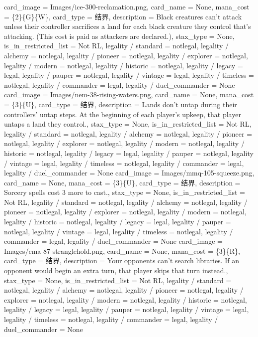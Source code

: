 \documentclass[lang = cn, color = black, 10pt]{AllThatStax}
\begin{document}
\card
{
	card_image = Images/ice-300-reclamation.png,
	card_name = None,
	mana_cost = \{2\}\{G\}\{W\},
	card_type = 结界,
	description = Black creatures can't attack unless their controller sacrifices a land for each black creature they control that's attacking. (This cost is paid as attackers are declared.),
	stax_type = None,
	is_in_restricted_list = Not RL,
	legality / standard = notlegal,
	legality / alchemy = notlegal,
	legality / pioneer = notlegal,
	legality / explorer = notlegal,
	legality / modern = notlegal,
	legality / historic = notlegal,
	legality / legacy = legal,
	legality / pauper = notlegal,
	legality / vintage = legal,
	legality / timeless = notlegal,
	legality / commander = legal,
	legality / duel_commander = None
}
\card
{
	card_image = Images/nem-38-rising-waters.png,
	card_name = None,
	mana_cost = \{3\}\{U\},
	card_type = 结界,
	description = Lands don't untap during their controllers' untap steps.
	At the beginning of each player's upkeep, that player untaps a land they control.,
	stax_type = None,
	is_in_restricted_list = Not RL,
	legality / standard = notlegal,
	legality / alchemy = notlegal,
	legality / pioneer = notlegal,
	legality / explorer = notlegal,
	legality / modern = notlegal,
	legality / historic = notlegal,
	legality / legacy = legal,
	legality / pauper = notlegal,
	legality / vintage = legal,
	legality / timeless = notlegal,
	legality / commander = legal,
	legality / duel_commander = None
}
\card
{
	card_image = Images/mmq-105-squeeze.png,
	card_name = None,
	mana_cost = \{3\}\{U\},
	card_type = 结界,
	description = Sorcery spells cost {3} more to cast.,
	stax_type = None,
	is_in_restricted_list = Not RL,
	legality / standard = notlegal,
	legality / alchemy = notlegal,
	legality / pioneer = notlegal,
	legality / explorer = notlegal,
	legality / modern = notlegal,
	legality / historic = notlegal,
	legality / legacy = legal,
	legality / pauper = notlegal,
	legality / vintage = legal,
	legality / timeless = notlegal,
	legality / commander = legal,
	legality / duel_commander = None
}
\card
{
	card_image = Images/cma-87-stranglehold.png,
	card_name = None,
	mana_cost = \{3\}\{R\},
	card_type = 结界,
	description = Your opponents can't search libraries.
	If an opponent would begin an extra turn, that player skips that turn instead.,
	stax_type = None,
	is_in_restricted_list = Not RL,
	legality / standard = notlegal,
	legality / alchemy = notlegal,
	legality / pioneer = notlegal,
	legality / explorer = notlegal,
	legality / modern = notlegal,
	legality / historic = notlegal,
	legality / legacy = legal,
	legality / pauper = notlegal,
	legality / vintage = legal,
	legality / timeless = notlegal,
	legality / commander = legal,
	legality / duel_commander = None
}
\end{document}
